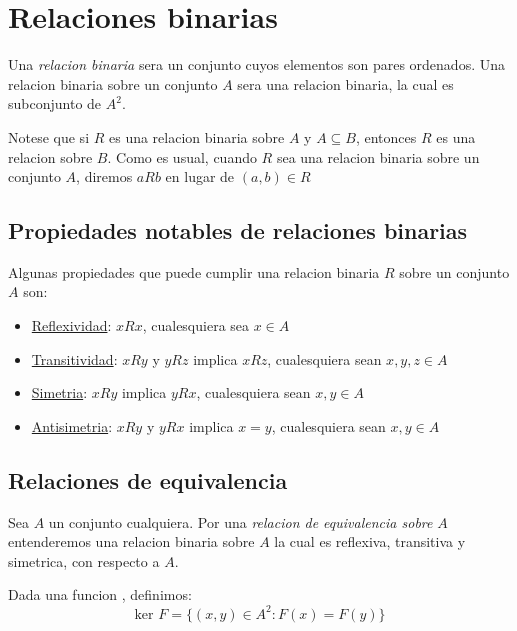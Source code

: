 

\section{Relaciones binarias}

\begin{definition}

  Una \emph{relacion binaria} sera un conjunto cuyos elementos son pares ordenados. Una relacion
  binaria sobre un conjunto $A$ sera una relacion binaria, la cual es subconjunto de $A^2$.

  Notese que si $R$ es una relacion binaria sobre $A$ y $A \subseteq B$, entonces $R$ es una
  relacion sobre $B$. Como es usual, cuando $R$ sea una relacion binaria sobre un conjunto
  $A$, diremos $aRb$ en lugar de $(a, b) \in R$
\end{definition}


\subsection{Propiedades notables de relaciones binarias}
Algunas propiedades que puede cumplir una relacion binaria $R$ sobre un conjunto $A$ son:
\begin{itemize}
  \item \underline{Reflexividad}: $xRx$, cualesquiera sea $x \in A$
  \item \underline{Transitividad}: $xRy$ y $yRz$ implica $xRz$, cualesquiera sean $x,y,z \in A$
  \item \underline{Simetria}: $xRy$ implica $yRx$, cualesquiera sean $x,y \in A$
  \item \underline{Antisimetria}: $xRy$ y $yRx$ implica $x=y$, cualesquiera sean $x,y \in A$
\end{itemize}


\subsection{Relaciones de equivalencia}
\begin{definition}
  Sea $A$ un conjunto cualquiera. Por una \emph{relacion de equivalencia sobre} $A$ entenderemos
  una relacion binaria sobre $A$ la cual es reflexiva, transitiva y simetrica, con respecto a $A$.
\end{definition}

\begin{definition}
  Dada una funcion , definimos:
  $$
  \text{ker }F = \{(x, y) \in A^2 : F(x) = F(y)\}
  $$
\end{definition}

